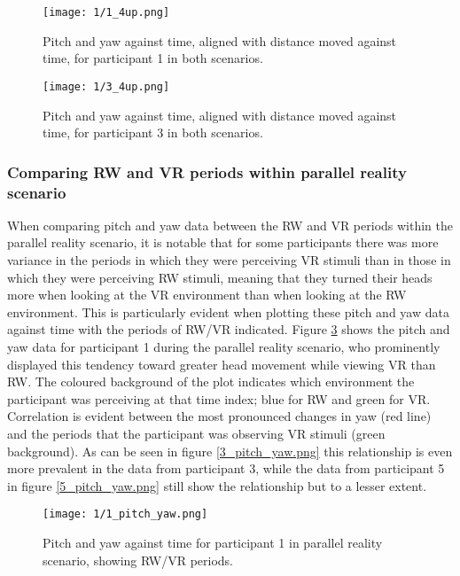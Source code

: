 \begin{figure}
	\begin{center}
	\texttt{[image: 1/1\_4up.png]}
	\caption{Pitch and yaw against time, aligned with distance moved against time, for participant 1 in both scenarios.}
	\label{1_4up.png}
	\end{center}
\end{figure}

\begin{figure}
	\begin{center}
	\texttt{[image: 1/3\_4up.png]}
	\caption{Pitch and yaw against time, aligned with distance moved against time, for participant 3 in both scenarios.}
	\label{3_4up.png}
	\end{center}
\end{figure}

\subsubsection{Comparing RW and VR periods within parallel reality scenario}

When comparing pitch and yaw data between the RW and VR periods within the parallel reality scenario, it is notable that for some participants there was more variance in the periods in which they were perceiving VR stimuli than in those in which they were perceiving RW stimuli, meaning that they turned their heads more when looking at the VR environment than when looking at the RW environment. This is particularly evident when plotting these pitch and yaw data against time with the periods of RW/VR indicated. Figure \ref{1_pitch_yaw.png} shows the pitch and yaw data for participant 1 during the parallel reality scenario, who prominently displayed this tendency toward greater head movement while viewing VR than RW. The coloured background of the plot indicates which environment the participant was perceiving at that time index; blue for RW and green for VR. Correlation is evident between the most pronounced changes in yaw (red line) and the periods that the participant was observing VR stimuli (green background). As can be seen in figure \ref{3_pitch_yaw.png} this relationship is even more prevalent in the data from participant 3, while the data from participant 5 in figure \ref{5_pitch_yaw.png} still show the relationship but to a lesser extent.

\begin{figure}
	\begin{center}
	\texttt{[image: 1/1\_pitch\_yaw.png]}
	\caption{Pitch and yaw against time for participant 1 in parallel reality scenario, showing RW/VR periods.}
	\label{1_pitch_yaw.png}
	\end{center}
\end{figure}

